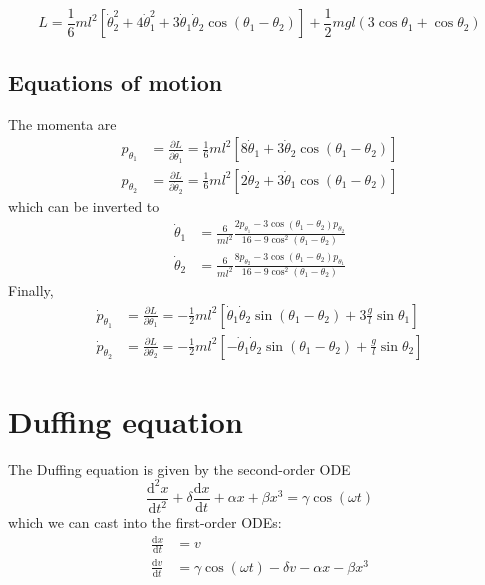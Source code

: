 \documentclass{report}
\begin{document}
\begin{equation}
  L = \frac{1}{6} ml^2 \left[ \dot{\theta}^2_2 + 4\dot{\theta}^2_1 + 3 \dot{\theta}_1 \dot{\theta}_2 \cos(\theta_1 - \theta_2) \right] + \frac{1}{2} mgl(3 \cos\theta_1 + \cos\theta_2)
\end{equation}

\section{Equations of motion}

The momenta are
\begin{align}
  p_{\theta_1} &= \frac{\partial L}{\partial \dot{\theta}_1} = \frac{1}{6} ml^2 \left[8 \dot{\theta}_1 + 3 \dot{\theta}_2 \cos(\theta_1 - \theta_2) \right] \\
  p_{\theta_2} &= \frac{\partial L}{\partial \dot{\theta}_2} = \frac{1}{6} ml^2 \left[2 \dot{\theta}_2 + 3 \dot{\theta}_1 \cos(\theta_1 - \theta_2) \right]
\end{align}
which can be inverted to
\begin{align}
  \dot{\theta}_1 &= \frac{6}{ml^2} \frac{2 p_{\theta_1} - 3 \cos(\theta_1 - \theta_2) p_{\theta_2}}{16 - 9 \cos^2(\theta_1 - \theta_2)} \\
  \dot{\theta}_2 &= \frac{6}{ml^2} \frac{8 p_{\theta_2} - 3 \cos(\theta_1 - \theta_2) p_{\theta_1}}{16 - 9 \cos^2(\theta_1 - \theta_2)}
\end{align}
Finally,
\begin{align}
  \dot{p}_{\theta_1} &= \frac{\partial L}{\partial\theta_1} = - \frac{1}{2} ml^2 \left[\dot{\theta}_1 \dot{\theta}_2 \sin(\theta_1 - \theta_2) + 3 \frac{g}{l} \sin\theta_1 \right] \\
  \dot{p}_{\theta_2} &= \frac{\partial L}{\partial\theta_2} = - \frac{1}{2} ml^2 \left[- \dot{\theta}_1 \dot{\theta}_2 \sin(\theta_1 - \theta_2) + \frac{g}{l} \sin\theta_2 \right]
\end{align}


\chapter{Duffing equation}

The Duffing equation is given by the second-order ODE
\begin{equation}
  \frac{\mathrm{d}^2x}{\mathrm{d}t^2} + \delta \frac{\mathrm{d}x}{\mathrm{d}t} + \alpha x + \beta x^3 = \gamma \cos(\omega t)
\end{equation}
which we can cast into the first-order ODEs:
\begin{align}
  \frac{\mathrm{d}x}{\mathrm{d}t} &= v \\
  \frac{\mathrm{d}v}{\mathrm{d}t} &= \gamma \cos(\omega t) - \delta v - \alpha x - \beta x^3
\end{align}
\end{document}

